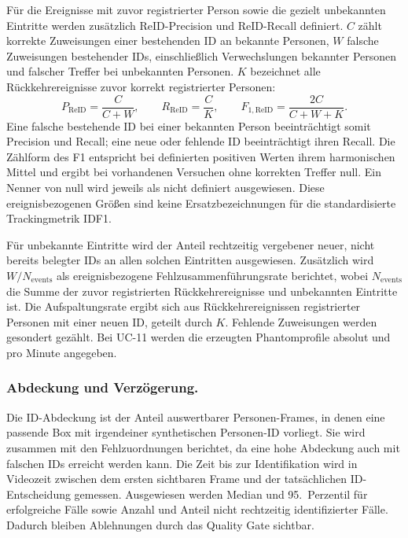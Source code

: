 \documentclass[runningheads]{llncs}
\begin{document}
Für die Ereignisse mit zuvor registrierter Person sowie die gezielt unbekannten Eintritte werden zusätzlich ReID-Precision und ReID-Recall definiert. $C$ zählt korrekte Zuweisungen einer bestehenden ID an bekannte Personen, $W$ falsche Zuweisungen bestehender IDs, einschließlich Verwechslungen bekannter Personen und falscher Treffer bei unbekannten Personen. $K$ bezeichnet alle Rückkehrereignisse zuvor korrekt registrierter Personen:
\begin{equation}
P_{\mathrm{ReID}}=\frac{C}{C+W},\qquad
R_{\mathrm{ReID}}=\frac{C}{K},\qquad
F_{1,\mathrm{ReID}}=
\frac{2C}{C+W+K}.
\label{eq:eval-reid}
\end{equation}
Eine falsche bestehende ID bei einer bekannten Person beeinträchtigt somit Precision und Recall; eine neue oder fehlende ID beeinträchtigt ihren Recall. Die Zählform des F1 entspricht bei definierten positiven Werten ihrem harmonischen Mittel und ergibt bei vorhandenen Versuchen ohne korrekten Treffer null. Ein Nenner von null wird jeweils als nicht definiert ausgewiesen. Diese ereignisbezogenen Größen sind keine Ersatzbezeichnungen für die standardisierte Trackingmetrik IDF1.

Für unbekannte Eintritte wird der Anteil rechtzeitig vergebener neuer, nicht bereits belegter IDs an allen solchen Eintritten ausgewiesen. Zusätzlich wird $W/N_{\mathrm{events}}$ als ereignisbezogene Fehlzusammenführungsrate berichtet, wobei $N_{\mathrm{events}}$ die Summe der zuvor registrierten Rückkehrereignisse und unbekannten Eintritte ist. Die Aufspaltungsrate ergibt sich aus Rückkehrereignissen registrierter Personen mit einer neuen ID, geteilt durch $K$. Fehlende Zuweisungen werden gesondert gezählt. Bei UC-11 werden die erzeugten Phantomprofile absolut und pro Minute angegeben.

\subsubsection{Abdeckung und Verzögerung.}
Die ID-Abdeckung ist der Anteil auswertbarer Personen-Frames, in denen eine passende Box mit irgendeiner synthetischen Personen-ID vorliegt. Sie wird zusammen mit den Fehlzuordnungen berichtet, da eine hohe Abdeckung auch mit falschen IDs erreicht werden kann. Die Zeit bis zur Identifikation wird in Videozeit zwischen dem ersten sichtbaren Frame und der tatsächlichen ID-Entscheidung gemessen. Ausgewiesen werden Median und 95.~Perzentil für erfolgreiche Fälle sowie Anzahl und Anteil nicht rechtzeitig identifizierter Fälle. Dadurch bleiben Ablehnungen durch das Quality Gate sichtbar.
\end{document}
